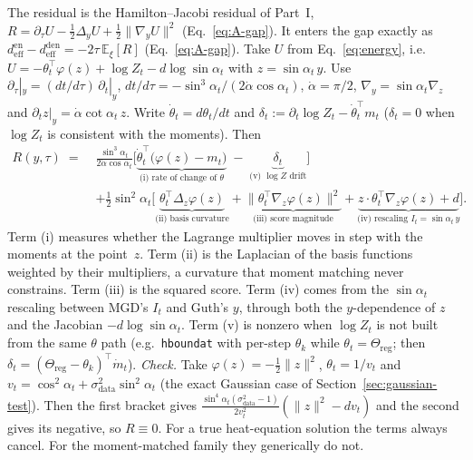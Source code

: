 \documentclass[11pt]{article}
\newcommand{\E}{\mathbb{E}}
\newcommand{\code}[1]{\texttt{#1}}
\renewcommand{\_}{\origunderscore\allowbreak}
\newcommand{\deff}{d_{\mathrm{eff}}}
\begin{document}
The residual is the Hamilton--Jacobi residual of Part~I,
$R=\partial_\tau U-\tfrac12\Delta_yU+\tfrac12\lVert\nabla_yU\rVert^2$
(Eq.~\ref{eq:A-gap}). It enters the gap exactly as
$\deff^{\mathrm{en}}-\deff^{\mathrm{den}}=-2\tau\,\E_\xi[R]$ (Eq.~\ref{eq:A-gap}).
Take $U$ from Eq.~\ref{eq:energy}, i.e.\
$U=-\theta_t^\top\varphi(z)+\log Z_t-d\log\sin\alpha_t$ with $z=\sin\alpha_t\,y$.
Use $\partial_\tau|_y=(dt/d\tau)\,\partial_t|_y$, $dt/d\tau=-\sin^3\!\alpha_t/(2\dot\alpha\cos\alpha_t)$,
$\dot\alpha=\pi/2$, $\nabla_y=\sin\alpha_t\nabla_z$ and $\partial_t z|_y=\dot\alpha\cot\alpha_t\,z$.
Write $\dot\theta_t=d\theta_t/dt$ and
$\delta_t:=\partial_t\log Z_t-\dot\theta_t^\top m_t$ ($\delta_t=0$ when $\log Z_t$ is
consistent with the moments). Then
\begin{equation}
\begin{aligned}
  R(y,\tau) \;=\;& \frac{\sin^3\alpha_t}{2\dot\alpha\cos\alpha_t}\Big[
     \underbrace{\dot\theta_t^\top\big(\varphi(z)-m_t\big)}_{\text{(i) rate of change of }\theta}
     \;-\;\underbrace{\delta_t}_{\text{(v) }\log Z\text{ drift}}\Big]\\
  &+\tfrac12\sin^2\alpha_t\Big[
     \underbrace{\theta_t^\top\Delta_z\varphi(z)}_{\text{(ii) basis curvature}}
     +\underbrace{\big\lVert\theta_t^\top\nabla_z\varphi(z)\big\rVert^2}_{\text{(iii) score magnitude}}
     +\underbrace{z\cdot\theta_t^\top\nabla_z\varphi(z)+d}_{\text{(iv) rescaling }I_t=\sin\alpha_t\,y}\Big].
\end{aligned}
  \label{eq:fpe-residual}
\end{equation}
Term (i) measures whether the Lagrange multiplier moves in step with the
moments at the point~$z$. Term (ii) is the Laplacian of the basis functions
weighted by their multipliers, a curvature that moment matching never
constrains. Term (iii) is the squared score. Term (iv) comes from the
$\sin\alpha_t$ rescaling between MGD's $I_t$ and Guth's $y$, through both the
$y$-dependence of $z$ and the Jacobian $-d\log\sin\alpha_t$. Term (v) is
nonzero when $\log Z_t$ is not built from the same $\theta$ path (e.g.\
\code{h\_bound\_at} with per-step $\theta_k$ while $\theta_t=\Theta_{\mathrm{reg}}$;
then $\delta_t=(\Theta_{\mathrm{reg}}-\theta_k)^\top\dot m_t$).
\emph{Check.} Take $\varphi(z)=-\tfrac12\lVert z\rVert^2$,
$\theta_t=1/v_t$ and $v_t=\cos^2\alpha_t+\sigma^2_{\mathrm{data}}\sin^2\alpha_t$ (the
exact Gaussian case of Section~\ref{sec:gaussian-test}). Then the first
bracket gives $\tfrac{\sin^4\alpha_t(\sigma^2_{\mathrm{data}}-1)}{2v_t^2}(\lVert z\rVert^2-dv_t)$
and the second gives its negative, so $R\equiv0$. For a true heat-equation solution the
terms always cancel. For the moment-matched family they generically do not.
\end{document}
